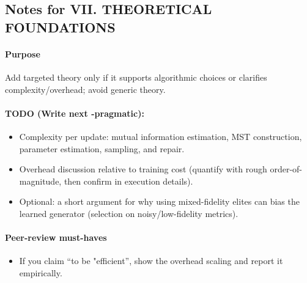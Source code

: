 \subsection*{Notes for VII. THEORETICAL FOUNDATIONS}
\paragraph{Purpose}
Add targeted theory only if it supports algorithmic choices or clarifies complexity/overhead; avoid generic theory.

\paragraph{TODO (Write next -pragmatic):}
\begin{itemize}
  \item Complexity per update: mutual information estimation, MST construction, parameter estimation, sampling, and repair.
  \item Overhead discussion relative to training cost (quantify with rough order-of-magnitude, then confirm in execution details).
  \item Optional: a short argument for why using mixed-fidelity elites can bias the learned generator (selection on noisy/low-fidelity metrics).
\end{itemize}

\paragraph{Peer-review must-haves}
\begin{itemize}
  \item If you claim “to be "efficient”, show the overhead scaling and report it empirically.
\end{itemize}
